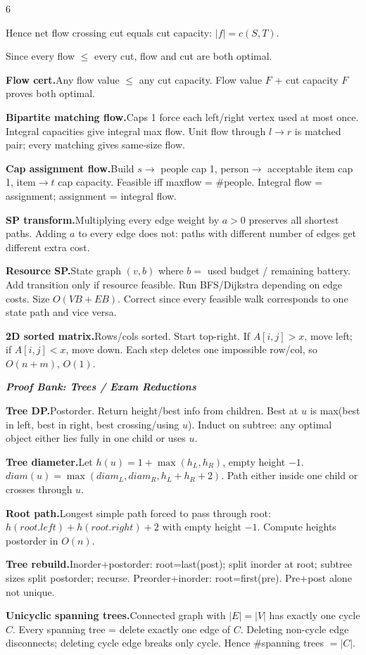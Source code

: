 \documentclass[a4paper,landscape]{article}
\newcommand{\subsectionsize}{\fontsize{3.92}{4.02}\selectfont}
\newcommand{\proofbanktitle}[1]{%
  \par\vspace{0pt}%
  {\subsectionsize\bfseries\itshape\color{rustKeyword} #1}\par%
  \vspace{0pt}%
}
\newcommand{\proofitem}[2]{%
  \par\vspace{0pt}%
  \noindent\hangindent=0.42cm\hangafter=1%
  {\bfseries\color{rustFunction} #1.}\hspace{0.055cm}#2\par%
}
\begin{document}
\begin{multicols*}{6}
{Hence net flow crossing cut equals cut capacity:
$|f| = c(S,T)$.

Since every flow $\le$ every cut,
flow and cut are both optimal.}

\proofitem{Flow cert}{Any flow value $\le$ any cut capacity. Flow value $F$ + cut capacity $F$ proves both optimal.}

\proofitem{Bipartite matching flow}{Caps 1 force each left/right vertex used at most once. Integral capacities give integral max flow. Unit flow through $l\to r$ is matched pair; every matching gives same-size flow.}

\proofitem{Cap assignment flow}{Build $s\to$ people cap 1, person$\to$ acceptable item cap 1, item$\to t$ cap capacity. Feasible iff maxflow = \#people. Integral flow = assignment; assignment = integral flow.}

\proofitem{SP transform}{Multiplying every edge weight by $a>0$ preserves all shortest paths. Adding $a$ to every edge does not: paths with different number of edges get different extra cost.}

\proofitem{Resource SP}{State graph $(v,b)$ where $b=$ used budget / remaining battery. Add transition only if resource feasible. Run BFS/Dijkstra depending on edge costs. Size $O(VB+EB)$. Correct since every feasible walk corresponds to one state path and vice versa.}
\proofitem{2D sorted matrix}{Rows/cols sorted. Start top-right. If $A[i,j]>x$, move left; if $A[i,j]<x$, move down. Each step deletes one impossible row/col, so $O(n+m)$, $O(1)$.}
\proofbanktitle{Proof Bank: Trees / Exam Reductions}
\proofitem{Tree DP}{Postorder. Return height/best info from children. Best at $u$ is max(best in left, best in right, best crossing/using $u$). Induct on subtree: any optimal object either lies fully in one child or uses $u$.}

\proofitem{Tree diameter}{Let $h(u)=1+\max(h_L,h_R)$, empty height $-1$. $diam(u)=\max(diam_L,diam_R,h_L+h_R+2)$. Path either inside one child or crosses through $u$.}
\proofitem{Root path}{Longest simple path forced to pass through root: $h(root.left)+h(root.right)+2$ with empty height $-1$. Compute heights postorder in $O(n)$.}
\proofitem{Tree rebuild}{Inorder+postorder: root=last(post); split inorder at root; subtree sizes split postorder; recurse. Preorder+inorder: root=first(pre). Pre+post alone not unique.}

\proofitem{Unicyclic spanning trees}{Connected graph with $|E|=|V|$ has exactly one cycle $C$. Every spanning tree = delete exactly one edge of $C$. Deleting non-cycle edge disconnects; deleting cycle edge breaks only cycle. Hence \#spanning trees $=|C|$.}



\end{multicols*}
\end{document}
